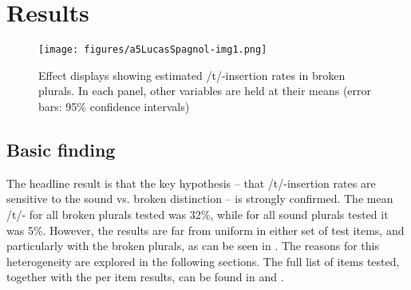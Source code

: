 \documentclass[output=paper]{langsci/langscibook}
\begin{document}
\largerpage
\section{Results}\label{sec:lucas:3}
\begin{figure}[b]
\texttt{[image: figures/a5LucasSpagnol-img1.png]}
\caption{
Effect displays showing estimated /t/-insertion rates in broken plurals. In each panel, other variables are held at their means (error bars: 95\% confidence intervals)
} 
\label{fig:lucas:2}
\end{figure}
\subsection{Basic finding}\label{sec:finding1}
The headline result is that the key hypothesis – that /t/-insertion rates are sensitive to the sound vs. broken  distinction – is strongly confirmed. The mean /t/- for all broken plurals tested was 32\%, while for all sound plurals tested it was 5\%. However, the results are far from uniform in either set of test items, and particularly with the broken plurals, as can be seen in . The reasons for this heterogeneity are explored in the following sections. The full list of items tested, together with the per item results, can be found in  and . 
\end{document}
